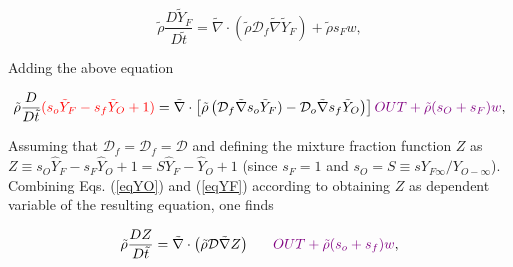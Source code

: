 \documentclass[preprint,12pt,authoryear]{elsarticle}
\begin{document}
\begin{equation}
	\tilde{\rho} \frac{D  \tilde{Y}_F }{D \tilde{t}}
= 
	\tilde{\nabla}\cdot( \tilde{\rho} \mathcal{D}_f\tilde{\nabla} \tilde{Y}_F)
	+
        \tilde{\rho}s_F w	,
\label{eqYF}
\end{equation}

Adding the above equation

\begin{equation}
	\tilde{\rho} \frac{D  }{D \tilde{t}} 
	{\color{red} (s_o \tilde{Y}_F - s_f \tilde{Y}_O + 1) }
= 
	\tilde{\nabla}
	\cdot
	\left[
		\tilde{\rho} 
		\left( 
			\mathcal{D}_f\tilde{\nabla} s_o \tilde{Y}_F)
			-
		    \mathcal{D}_o\tilde{\nabla} {s_f \tilde{Y}_O}
		\right) 
	\right] 
%
	{\color{violet} OUT + \tilde{\rho}(s_O+{s}_F)w	}
 ,
\end{equation}

Assuming that $\mathcal{D}_f=\mathcal{D}_f=\mathcal{D}$ and {\color{red} defining the mixture fraction function $Z$ as $Z \equiv s_O\hat{Y}_F - s_F \hat{Y}_O + 1 = S\hat{Y}_F -  \hat{Y}_O + 1$ (since $s_F=1$ and $s_O= S \equiv s Y_{F\infty}/Y_{O-\infty}$).
%
Combining Eqs. (\ref{eqYO}) and (\ref{eqYF})  according to obtaining $Z$ as dependent variable of the resulting equation, one finds}

\begin{equation}
	\tilde{\rho} \frac{D Z }{D \tilde{t}}
= 
	\tilde{\nabla}
	\cdot
	\left(
		\tilde{\rho} \mathcal{D} \tilde{\nabla} Z 
	\right)  \ \ \ \ \ 
	{\color{violet} OUT +	\tilde{\rho}(s_o+{s}_f)w	},
\end{equation}
\end{document}
